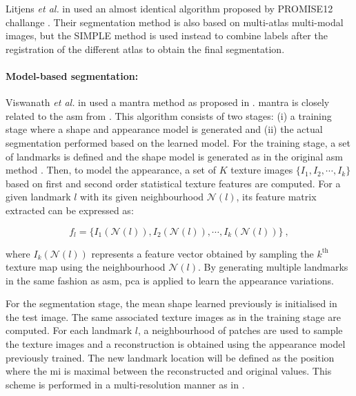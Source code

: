 Litjens \textit{et al.} in \cite{Litjens2014} used an almost identical algorithm proposed by PROMISE12 challange \cite{Litjens2014a}.
Their segmentation method is also based on multi-atlas multi-modal images, but the SIMPLE method \cite{langerak2010label} is used instead to combine labels after the registration of the different atlas to obtain the final segmentation.
 
\paragraph{Model-based segmentation:}
Viswanath \textit{et al.} in \cite{Viswanath2008a,Viswanath2009} used a \ac{mantra} method as proposed in \cite{Toth2008}.
\ac{mantra} is closely related to the \ac{asm} from \cite{Cootes1995}.
This algorithm consists of two stages: (i) a training stage where a shape and appearance model is generated and (ii) the actual segmentation performed based on the learned model. 
For the training stage, a set of landmarks is defined and the shape model is generated as in the original \ac{asm} method \cite{Cootes1995}.
Then, to model the appearance, a set of $K$ texture images $\{I_1,I_2,\cdots,I_k\}$ based on first and second order statistical texture features are computed.
For a given landmark $l$ with its given neighbourhood $\mathcal{N}(l)$, its feature matrix extracted can be expressed as:

\begin{equation}
	f_l = \{ I_1(\mathcal{N}(l)), I_2(\mathcal{N}(l)), \cdots, I_k(\mathcal{N}(l)) \} \ ,
	\label{eq:mantra1}
\end{equation}

\noindent where $I_k(\mathcal{N}(l))$ represents a feature vector obtained by sampling the $k^{\text{th}}$ texture map using the neighbourhood $\mathcal{N}(l)$.
By generating multiple landmarks in the same fashion as \ac{asm}, \ac{pca} \cite{Pearson1901} is applied to learn the appearance variations.

For the segmentation stage, the mean shape learned previously is initialised in the test image.
The same associated texture images as in the training stage are computed.
For each landmark $l$, a neighbourhood of patches are used to sample the texture images and a reconstruction is obtained using the appearance model previously trained.
The new landmark location will be defined as the position where the \ac{mi} is maximal between the reconstructed and original values.
This scheme is performed in a multi-resolution manner as in \cite{Cootes1995}.

